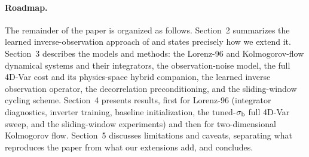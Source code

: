 \paragraph{Roadmap.}
The remainder of the paper is organized as follows. Section~2 summarizes the learned
inverse-observation approach of \citet{frerix2021invobs} and states precisely how we
extend it. Section~3 describes the models and methods: the Lorenz-96 and Kolmogorov-flow
dynamical systems and their integrators, the observation-noise model, the full 4D-Var
cost and its physics-space hybrid companion, the learned inverse observation operator,
the decorrelation preconditioning, and the sliding-window cycling scheme. Section~4
presents results, first for Lorenz-96 (integrator diagnostics, inverter training,
baseline initialization, the tuned-$\sigma_{\mathrm{b}}$ full 4D-Var sweep, and the sliding-window
experiments) and then for two-dimensional Kolmogorov flow. Section~5 discusses
limitations and caveats, separating what reproduces the paper from what our extensions
add, and concludes.
